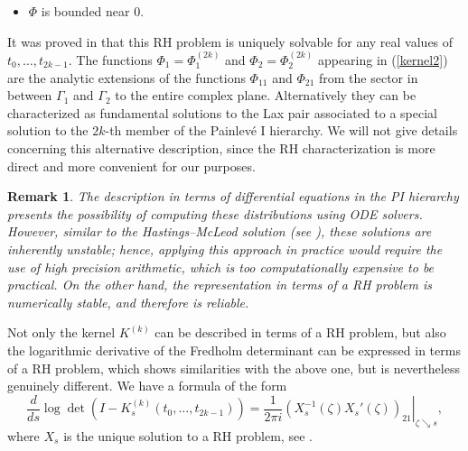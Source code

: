\documentclass[11pt,fleqn]{article}
\numberwithin{equation}{section}
\newtheorem{Remark}[theorem]{Remark}
\newenvironment{remark}{\begin{Remark}\rm}{\end{Remark}}
\begin{document}
\begin{itemize}
\begin{equation}
\begin{pmatrix}
             1 & 1 \\
             -1 & 1
        \end{pmatrix}e^{-\frac{1}{4}\pi i\sigma_3},
    \end{equation}
    and
    \begin{equation}\label{def theta0}
        \theta(\zeta;t_0,\ldots,t_{2k-1})=\frac{2}{4k+3}\zeta^{\frac{4k+3}{2}}-2\sum_{j=0}^{2k-1}\frac{
        (-1)^{j}t_{j}}{2j+1}\zeta^{\frac{2j+1}{2}},
    \end{equation}
    where the fractional powers are the principal branches analytic for $\zeta\in \mathbb C\setminus (-\infty,0]$ and positive for $\zeta>0$.
    \item[(d)] $\Phi$ is bounded near $0$.
\end{itemize}
It was proved in \cite{CIK} that this RH problem is uniquely
solvable for any real values of $t_0,\ldots,t_{2k-1}$. The functions
$\Phi_1=\Phi_1^{(2k)}$ and $\Phi_2=\Phi_2^{(2k)}$ appearing in
(\ref{kernel2}) are the analytic extensions of the functions
$\Phi_{11}$ and $\Phi_{21}$ from the sector in between $\Gamma_1$
and $\Gamma_2$ to the entire complex plane. Alternatively they can
be characterized as fundamental solutions to the Lax pair associated
to a special solution to the $2k$-th member of the Painlev\'e I
hierarchy. We will not give details concerning this alternative
description, since the RH characterization is more direct and more
convenient for our purposes.

\begin{remark}
    The description in terms of differential
equations in the PI hierarchy presents the possibility of computing
these distributions using ODE solvers.  However, similar to the Hastings--McLeod solution (see
\cite{PrahoferSpohnKPZ}),  these solutions  are inherently
unstable; hence, applying this approach in
practice would require the use of high precision arithmetic, which is too computationally expensive to be practical.
On the other hand, the representation in terms of a RH problem is
numerically stable, and therefore is reliable.
\end{remark}


\medskip

Not only the kernel $K^{(k)}$ can be described in terms of a RH problem, but also the logarithmic derivative of the Fredholm determinant can be expressed in terms of a RH problem, which shows similarities with the above one, but is nevertheless genuinely different. We have a formula of the form
\begin{equation}\label{identityFredholmX}
\frac{d}{ds}\log\det(I-K_s^{(k)}(t_0,\ldots,
t_{2k-1}))=\frac{1}{2\pi
i}\left.\left(X_s^{-1}(\zeta)X_s'(\zeta)\right)_{21}\right|_{\zeta\searrow
s},
\end{equation}
where $X_s$ is the unique solution to a RH problem, see \cite[Section 2]{CIK}.
\end{document}
